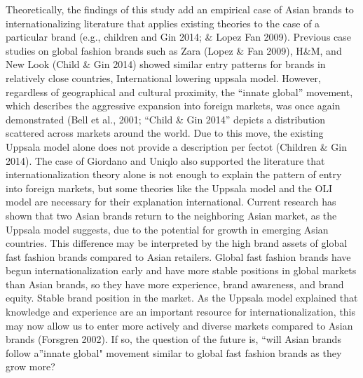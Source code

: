 \documentclass[12pt,]{article}
\begin{document}
Theoretically, the findings of this study add an empirical case of Asian
brands to internationalizing literature that applies existing theories
to the case of a particular brand (e.g., children and Gin 2014; \& Lopez
Fan 2009). Previous case studies on global fashion brands such as Zara
(Lopez \& Fan 2009), H\&M, and New Look (Child \& Gin 2014) showed
similar entry patterns for brands in relatively close countries,
International lowering uppsala model. However, regardless of
geographical and cultural proximity, the ``innate global'' movement,
which describes the aggressive expansion into foreign markets, was once
again demonstrated (Bell et al., 2001; ``Child \& Gin 2014'' depicts a
distribution scattered across markets around the world. Due to this
move, the existing Uppsala model alone does not provide a description
per fectot (Children \& Gin 2014). The case of Giordano and Uniqlo also
supported the literature that internationalization theory alone is not
enough to explain the pattern of entry into foreign markets, but some
theories like the Uppsala model and the OLI model are necessary for
their explanation international. Current research has shown that two
Asian brands return to the neighboring Asian market, as the Uppsala
model suggests, due to the potential for growth in emerging Asian
countries. This difference may be interpreted by the high brand assets
of global fast fashion brands compared to Asian retailers. Global fast
fashion brands have begun internationalization early and have more
stable positions in global markets than Asian brands, so they have more
experience, brand awareness, and brand equity. Stable brand position in
the market. As the Uppsala model explained that knowledge and experience
are an important resource for internationalization, this may now allow
us to enter more actively and diverse markets compared to Asian brands
(Forsgren 2002). If so, the question of the future is, ``will Asian
brands follow a''innate global" movement similar to global fast fashion
brands as they grow more?
\end{document}
